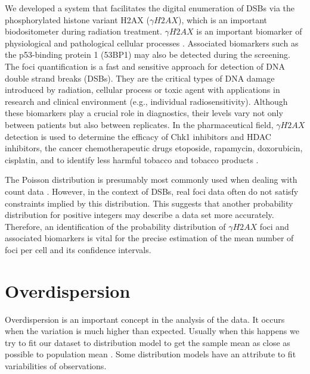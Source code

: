We developed a system that facilitates the digital  enumeration of DSBs via the phosphorylated histone variant H2AX ($\gamma H2AX$), which is an important  biodositometer during radiation treatment. $\gamma H2AX$ is an important biomarker of physiological and pathological cellular processes \citep{reddig_dna_2018,rodiger_quantification_2018}. Associated biomarkers such as the p53-binding protein 1 (53BP1) may also be detected during the screening. The foci quantification is a fast and sensitive approach for detection of DNA double strand breaks (DSBs).
They are the critical types of DNA damage introduced by radiation, cellular process or toxic agent with applications in research and clinical environment (e.g., individual radiosensitivity). Although these biomarkers play a crucial role in diagnostics, their levels vary not only between patients but also between replicates. In the pharmaceutical field, $\gamma H2AX$ detection is used to determine the efficacy of Chk1 inhibitors and HDAC inhibitors, the cancer chemotherapeutic drugs  etoposide, rapamycin, doxorubicin, cisplatin, and to identify less harmful tobacco and tobacco products \citep{dickey_h2ax:_2009, ruhe_molecular_2019, olive_kinetics_2009}.

The Poisson distribution is presumably most commonly used when dealing with count data \citep{morina_generalized_2015}. However, in the context of DSBs, real foci data often do not satisfy constraints implied by this distribution. This suggests that another probability distribution for positive integers may describe a data set more accurately. Therefore, an identification of the probability distribution of $\gamma H2AX$ foci and associated biomarkers is vital for the precise estimation of the mean number of foci per cell and its confidence intervals.


\section{Overdispersion}

Overdispersion is an important concept in the analysis of the data. It occurs when the variation is much higher than expected. Usually when this happens we try to fit our dataset to distribution model to get the sample mean as close as possible to population mean \citep{morina_generalized_2015}. Some distribution models have an attribute to fit variabilities of observations.

